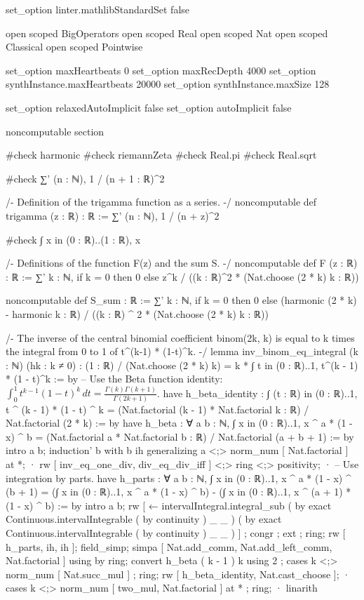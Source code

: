 set_option linter.mathlibStandardSet false

open scoped BigOperators
open scoped Real
open scoped Nat
open scoped Classical
open scoped Pointwise

set_option maxHeartbeats 0
set_option maxRecDepth 4000
set_option synthInstance.maxHeartbeats 20000
set_option synthInstance.maxSize 128

set_option relaxedAutoImplicit false
set_option autoImplicit false

noncomputable section

#check harmonic
#check riemannZeta
#check Real.pi
#check Real.sqrt

#check ∑' (n : ℕ), 1 / (n + 1 : ℝ)^2

/-
Definition of the trigamma function as a series.
-/
noncomputable def trigamma (z : ℝ) : ℝ := ∑' (n : ℕ), 1 / (n + z)^2

#check ∫ x in (0 : ℝ)..(1 : ℝ), x

/-
Definitions of the function F(z) and the sum S.
-/
noncomputable def F (z : ℝ) : ℝ := ∑' k : ℕ, if k = 0 then 0 else z^k / ((k : ℝ)^2 * (Nat.choose (2 * k) k : ℝ))

noncomputable def S_sum : ℝ := ∑' k : ℕ, if k = 0 then 0 else (harmonic (2 * k) - harmonic k : ℝ) / ((k : ℝ) ^ 2 * (Nat.choose (2 * k) k : ℝ))

/-
The inverse of the central binomial coefficient binom(2k, k) is equal to k times the integral from 0 to 1 of t^(k-1) * (1-t)^k.
-/
lemma inv_binom_eq_integral (k : ℕ) (hk : k ≠ 0) :
  (1 : ℝ) / (Nat.choose (2 * k) k) = k * ∫ t in (0 : ℝ)..1, t^(k - 1) * (1 - t)^k := by
    -- Use the Beta function identity: $\int_0^1 t^{k-1}(1-t)^k \, dt = \frac{\Gamma(k)\Gamma(k+1)}{\Gamma(2k+1)}$.
    have h_beta_identity : ∫ (t : ℝ) in (0 : ℝ)..1, t ^ (k - 1) * (1 - t) ^ k = (Nat.factorial (k - 1) * Nat.factorial k : ℝ) / Nat.factorial (2 * k) := by
      have h_beta : ∀ a b : ℕ, ∫ x in (0 : ℝ)..1, x ^ a * (1 - x) ^ b = (Nat.factorial a * Nat.factorial b : ℝ) / Nat.factorial (a + b + 1) := by
        intro a b; induction' b with b ih generalizing a <;> norm_num [ Nat.factorial ] at *;
        · rw [ inv_eq_one_div, div_eq_div_iff ] <;> ring <;> positivity;
        · -- Use integration by parts.
          have h_parts : ∀ a b : ℕ, ∫ x in (0 : ℝ)..1, x ^ a * (1 - x) ^ (b + 1) = (∫ x in (0 : ℝ)..1, x ^ a * (1 - x) ^ b) - (∫ x in (0 : ℝ)..1, x ^ (a + 1) * (1 - x) ^ b) := by
            intro a b; rw [ ← intervalIntegral.integral_sub ( by exact Continuous.intervalIntegrable ( by continuity ) _ _ ) ( by exact Continuous.intervalIntegrable ( by continuity ) _ _ ) ] ; congr ; ext ; ring;
          rw [ h_parts, ih, ih ];
          field_simp;
          simpa [ Nat.add_comm, Nat.add_left_comm, Nat.factorial ] using by ring;
      convert h_beta ( k - 1 ) k using 2 ; cases k <;> norm_num [ Nat.succ_mul ] ; ring;
    rw [ h_beta_identity, Nat.cast_choose ];
    · cases k <;> norm_num [ two_mul, Nat.factorial ] at * ; ring;
    · linarith

